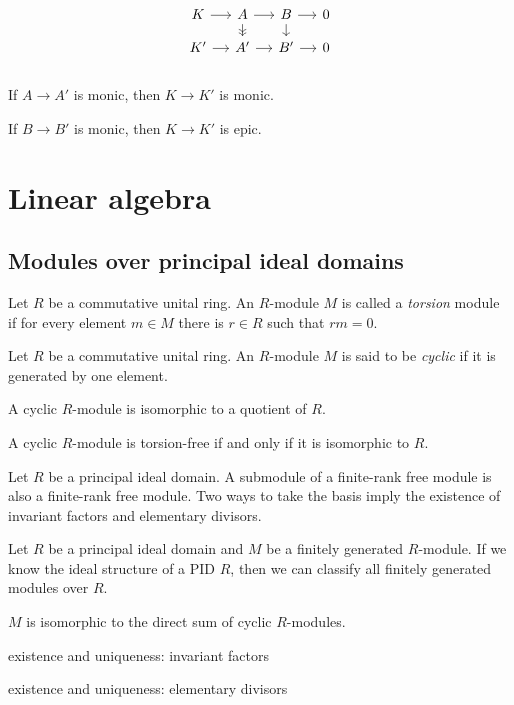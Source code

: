\documentclass{../../large}
\begin{document}
\[\begin{tikzcd}[sep=small]
K \rar & A \rar\dar[->>] & B \rar\dar & 0\\
K' \rar & A' \rar & B' \rar & 0\\
\end{tikzcd}\]
\begin{parts}
\item If $A\to A'$ is monic, then $K\to K'$ is monic.
\item If $B\to B'$ is monic, then $K\to K'$ is epic.
\end{parts}





\chapter{Linear algebra}
\section{Modules over principal ideal domains}

\begin{prb}
Let $R$ be a commutative unital ring.
An $R$-module $M$ is called a \emph{torsion} module if
for every element $m\in M$ there is $r\in R$ such that $rm=0$.
\end{prb}

\begin{prb}
Let $R$ be a commutative unital ring.
An $R$-module $M$ is said to be \emph{cyclic} if it is generated by one element.
\begin{parts}
\item A cyclic $R$-module is isomorphic to a quotient of $R$.
\item A cyclic $R$-module is torsion-free if and only if it is isomorphic to $R$.
\end{parts}
\end{prb}

\begin{prb}
Let $R$ be a principal ideal domain.
A submodule of a finite-rank free module is also a finite-rank free module.
Two ways to take the basis imply the existence of invariant factors and elementary divisors.
\end{prb}

\begin{prb}
Let $R$ be a principal ideal domain and $M$ be a finitely generated $R$-module.
If we know the ideal structure of a PID $R$, then we can classify all finitely generated modules over $R$.
\begin{parts}
\item $M$ is isomorphic to the direct sum of cyclic $R$-modules.
\item existence and uniqueness: invariant factors
\item existence and uniqueness: elementary divisors
\end{parts}
\end{prb}
\end{document}
